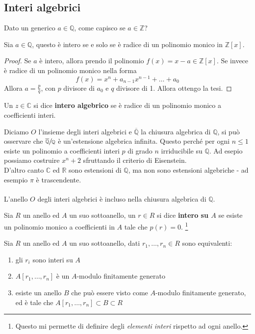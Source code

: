 \subsection{Interi algebrici}
\label{lezione17}
Dato un generico $a\in\mathbb{Q}$, come capisco se $a\in\mathbb{Z}$?
\begin{proposizione}
	Sia $a\in\mathbb{Q}$, questo è intero se e solo se è radice di un polinomio monico in $\mathbb{Z}[x]$.
\end{proposizione}
\begin{proof}
	Se $a$ è intero, allora prendo il polinomio $f(x)=x-a\in\mathbb{Z}[x]$. Se invece è radice di un polinomio monico nella forma
	\begin{equation*}
	f(x)=x^n+a_{n-1}x^{n-1}+\dots+a_0
	\end{equation*}
	Allora $a=\frac{p}{q}$, con $p$ divisore di $a_0$ e $q$ divisore di 1. Allora ottengo la tesi.
\end{proof}
\begin{definizione}
	Un $z\in\mathbb{C}$ si dice \textbf{intero algebrico} se è radice di un polinomio monico a coefficienti interi.
\end{definizione}
\begin{osservazione}
	Diciamo $O$ l'insieme degli interi algebrici e $\overline{\mathbb{Q}}$ la chiusura algebrica di $\mathbb{Q}$, si può osservare che $\sfrac{\overline{\mathbb{Q}}}{\mathbb{Q}}$ è un'estensione algebrica infinita. Questo perché per ogni $n\leq1$ esiste un polinomio a coefficienti interi $p$ di grado $n$ irriducibile su $\mathbb{Q}$. Ad esepio possiamo costruire $x^n+2$ sfruttando il criterio di Eisenstein. \\ D'altro canto $\mathbb{C}$ ed $\mathbb{R}$ sono estensioni di $\mathbb{Q}$, ma non sono estensioni algebriche - ad esempio $\pi$ è trascendente. \\ \\ L'anello $O$ degli interi algebrici è incluso nella chiusura algebrica di $\mathbb{Q}$.
\end{osservazione}
\begin{definizione}
	Sia $R$ un anello ed $A$ un suo sottoanello, un $r\in R$ si dice \textbf{intero su $A$} se esiste un polinomio monico a coefficienti in $A$ tale che $p(r)=0$. \footnote{Questo mi permette di definire degli \textit{elementi interi} rispetto ad ogni anello.}
\end{definizione}
\begin{proposizione}
	Sia $R$ un anello ed $A$ un suo sottoanello, dati $r_1,\dots,r_n\in R$ sono equivalenti:
	\begin{enumerate}
		\item gli $r_i$ sono interi su $A$
		\item $A[r_1,\dots,r_n]$ è un $A$-modulo finitamente generato
		\item esiste un anello $B$ che può essere visto come $A$-modulo finitamente generato, ed è tale che $A[r_1,\dots,r_n]\subset B\subset R$
	\end{enumerate}
\end{proposizione}
